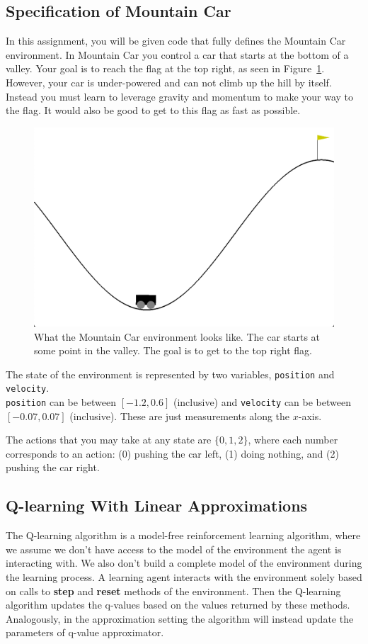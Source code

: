 \documentclass[11pt,addpoints,answers]{exam}
\begin{document}
\subsection{Specification of Mountain Car}
In this assignment, you will be given code that fully defines the Mountain Car environment. In Mountain Car you control a car that starts at the bottom of a valley. Your goal is to reach the flag at the top right, as seen in Figure~\ref{fig:mountaincar}. However, your car is under-powered and can not climb up the hill by itself. Instead you must learn to leverage gravity and momentum to make your way to the flag. It would also be good to get to this flag as fast as possible.

\begin{figure}[H]
    \centering
    \includegraphics[width=0.5\linewidth]{figs/MountainCar.png}
    \caption{What the Mountain Car environment looks like. The car starts at some point in the valley. The goal is to get to the top right flag.}
    \label{fig:mountaincar}
\end{figure}

The state of the environment is represented by two variables, \texttt{position} and \texttt{velocity}.\\\texttt{position} can be between $[-1.2, 0.6]$ (inclusive) and \texttt{velocity} can be between $[-0.07, 0.07]$ (inclusive). These are just measurements along the $x$-axis.

The actions that you may take at any state are $\{0, 1, 2\}$, where each number corresponds to an action: (0) pushing the car left, (1) doing nothing, and (2) pushing the car right.

\subsection{Q-learning With Linear Approximations}
The Q-learning algorithm is a model-free reinforcement learning algorithm, where we assume we don't have access to the model of the environment the agent is interacting with. We also don't build a complete model of the environment during the learning process. A learning agent interacts with the environment solely based on calls to \textbf{step} and \textbf{reset} methods of the environment. Then the Q-learning algorithm updates the q-values based on the values returned by these methods. Analogously, in the approximation setting the algorithm will instead update the parameters of q-value approximator.
\end{document}
